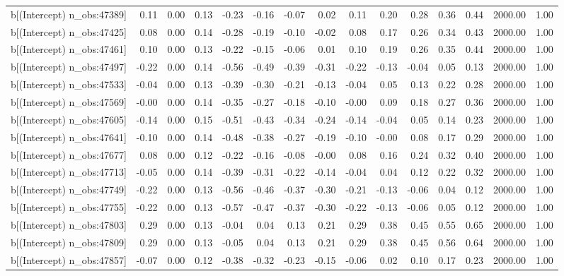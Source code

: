 \begin{table}[ht]
\begin{tabular}{rrrrrrrrrrrrrrr}
  b[(Intercept) n\_obs:47389] & 0.11 & 0.00 & 0.13 & -0.23 & -0.16 & -0.07 & 0.02 & 0.11 & 0.20 & 0.28 & 0.36 & 0.44 & 2000.00 & 1.00 \\ 
  b[(Intercept) n\_obs:47425] & 0.08 & 0.00 & 0.14 & -0.28 & -0.19 & -0.10 & -0.02 & 0.08 & 0.17 & 0.26 & 0.34 & 0.43 & 2000.00 & 1.00 \\ 
  b[(Intercept) n\_obs:47461] & 0.10 & 0.00 & 0.13 & -0.22 & -0.15 & -0.06 & 0.01 & 0.10 & 0.19 & 0.26 & 0.35 & 0.44 & 2000.00 & 1.00 \\ 
  b[(Intercept) n\_obs:47497] & -0.22 & 0.00 & 0.14 & -0.56 & -0.49 & -0.39 & -0.31 & -0.22 & -0.13 & -0.04 & 0.05 & 0.13 & 2000.00 & 1.00 \\ 
  b[(Intercept) n\_obs:47533] & -0.04 & 0.00 & 0.13 & -0.39 & -0.30 & -0.21 & -0.13 & -0.04 & 0.05 & 0.13 & 0.22 & 0.28 & 2000.00 & 1.00 \\ 
  b[(Intercept) n\_obs:47569] & -0.00 & 0.00 & 0.14 & -0.35 & -0.27 & -0.18 & -0.10 & -0.00 & 0.09 & 0.18 & 0.27 & 0.36 & 2000.00 & 1.00 \\ 
  b[(Intercept) n\_obs:47605] & -0.14 & 0.00 & 0.15 & -0.51 & -0.43 & -0.34 & -0.24 & -0.14 & -0.04 & 0.05 & 0.14 & 0.23 & 2000.00 & 1.00 \\ 
  b[(Intercept) n\_obs:47641] & -0.10 & 0.00 & 0.14 & -0.48 & -0.38 & -0.27 & -0.19 & -0.10 & -0.00 & 0.08 & 0.17 & 0.29 & 2000.00 & 1.00 \\ 
  b[(Intercept) n\_obs:47677] & 0.08 & 0.00 & 0.12 & -0.22 & -0.16 & -0.08 & -0.00 & 0.08 & 0.16 & 0.24 & 0.32 & 0.40 & 2000.00 & 1.00 \\ 
  b[(Intercept) n\_obs:47713] & -0.05 & 0.00 & 0.14 & -0.39 & -0.31 & -0.22 & -0.14 & -0.04 & 0.04 & 0.12 & 0.22 & 0.32 & 2000.00 & 1.00 \\ 
  b[(Intercept) n\_obs:47749] & -0.22 & 0.00 & 0.13 & -0.56 & -0.46 & -0.37 & -0.30 & -0.21 & -0.13 & -0.06 & 0.04 & 0.12 & 2000.00 & 1.00 \\ 
  b[(Intercept) n\_obs:47755] & -0.22 & 0.00 & 0.13 & -0.57 & -0.47 & -0.37 & -0.30 & -0.22 & -0.13 & -0.06 & 0.05 & 0.12 & 2000.00 & 1.00 \\ 
  b[(Intercept) n\_obs:47803] & 0.29 & 0.00 & 0.13 & -0.04 & 0.04 & 0.13 & 0.21 & 0.29 & 0.38 & 0.45 & 0.55 & 0.65 & 2000.00 & 1.00 \\ 
  b[(Intercept) n\_obs:47809] & 0.29 & 0.00 & 0.13 & -0.05 & 0.04 & 0.13 & 0.21 & 0.29 & 0.38 & 0.45 & 0.56 & 0.64 & 2000.00 & 1.00 \\ 
  b[(Intercept) n\_obs:47857] & -0.07 & 0.00 & 0.12 & -0.38 & -0.32 & -0.23 & -0.15 & -0.06 & 0.02 & 0.10 & 0.17 & 0.23 & 2000.00 & 1.00 \\ 

\end{tabular}
\end{table}
